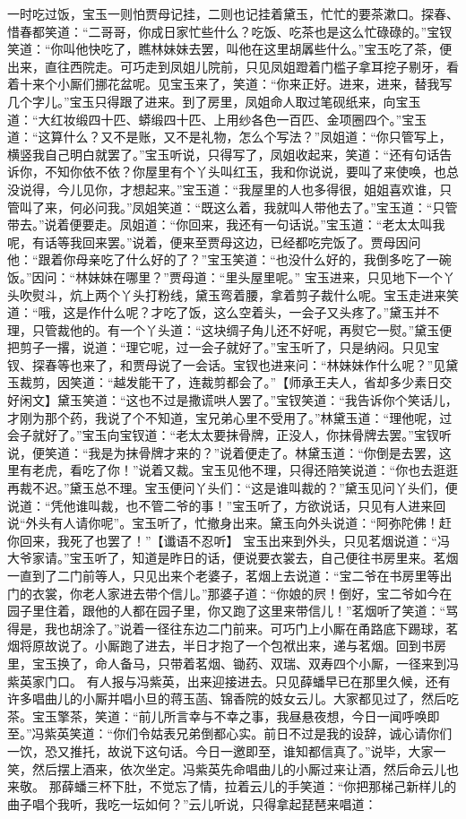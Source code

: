 \documentclass[12pt,oneside]{book}
\begin{document}
一时吃过饭，宝玉一则怕贾母记挂，二则也记挂着黛玉，忙忙的要茶漱口。探春、惜春都笑道：“二哥哥，你成日家忙些什么？吃饭、吃茶也是这么忙碌碌的。”宝钗笑道：“你叫他快吃了，瞧林妹妹去罢，叫他在这里胡羼些什么。”宝玉吃了茶，便出来，直往西院走。可巧走到凤姐儿院前，只见凤姐蹬着门槛子拿耳挖子剔牙，看着十来个小厮们挪花盆呢。见宝玉来了，笑道：“你来正好。进来，进来，替我写几个字儿。”宝玉只得跟了进来。到了房里，凤姐命人取过笔砚纸来，向宝玉道：“大红妆缎四十匹、蟒缎四十匹、上用纱各色一百匹、金项圈四个。”宝玉道：“这算什么？又不是账，又不是礼物，怎么个写法？”凤姐道：“你只管写上，横竖我自己明白就罢了。”宝玉听说，只得写了，凤姐收起来，笑道：“还有句话告诉你，不知你依不依？你屋里有个丫头叫红玉，我和你说说，要叫了来使唤，也总没说得，今儿见你，才想起来。”宝玉道：“我屋里的人也多得很，姐姐喜欢谁，只管叫了来，何必问我。”凤姐笑道：“既这么着，我就叫人带他去了。”宝玉道：“只管带去。”说着便要走。凤姐道：“你回来，我还有一句话说。”宝玉道：“老太太叫我呢，有话等我回来罢。”说着，便来至贾母这边，已经都吃完饭了。贾母因问他：“跟着你母亲吃了什么好的了？”宝玉笑道：“也没什么好的，我倒多吃了一碗饭。”因问：“林妹妹在哪里？”贾母道：“里头屋里呢。”
宝玉进来，只见地下一个丫头吹熨斗，炕上两个丫头打粉线，黛玉弯着腰，拿着剪子裁什么呢。宝玉走进来笑道：“哦，这是作什么呢？才吃了饭，这么空着头，一会子又头疼了。”黛玉并不理，只管裁他的。有一个丫头道：“这块绸子角儿还不好呢，再熨它一熨。”黛玉便把剪子一撂，说道：“理它呢，过一会子就好了。”宝玉听了，只是纳闷。只见宝钗、探春等也来了，和贾母说了一会话。宝钗也进来问：“林妹妹作什么呢？”见黛玉裁剪，因笑道：“越发能干了，连裁剪都会了。”【师承王夫人，省却多少素日交好闲文】黛玉笑道：“这也不过是撒谎哄人罢了。”宝钗笑道：“我告诉你个笑话儿，才刚为那个药，我说了个不知道，宝兄弟心里不受用了。”林黛玉道：“理他呢，过会子就好了。”宝玉向宝钗道：“老太太要抹骨牌，正没人，你抹骨牌去罢。”宝钗听说，便笑道：“我是为抹骨牌才来的？”说着便走了。林黛玉道：“你倒是去罢，这里有老虎，看吃了你！”说着又裁。宝玉见他不理，只得还陪笑说道：“你也去逛逛再裁不迟。”黛玉总不理。宝玉便问丫头们：“这是谁叫裁的？”黛玉见问丫头们，便说道：“凭他谁叫裁，也不管二爷的事！”宝玉听了，方欲说话，只见有人进来回说“外头有人请你呢”。宝玉听了，忙撤身出来。黛玉向外头说道：“阿弥陀佛！赶你回来，我死了也罢了！”【谶语不忍听】
宝玉出来到外头，只见茗烟说道：“冯大爷家请。”宝玉听了，知道是昨日的话，便说要衣裳去，自己便往书房里来。茗烟一直到了二门前等人，只见出来个老婆子，茗烟上去说道：“宝二爷在书房里等出门的衣裳，你老人家进去带个信儿。”那婆子道：“你娘的屄！倒好，宝二爷如今在园子里住着，跟他的人都在园子里，你又跑了这里来带信儿！”茗烟听了笑道：“骂得是，我也胡涂了。”说着一径往东边二门前来。可巧门上小厮在甬路底下踢球，茗烟将原故说了。小厮跑了进去，半日才抱了一个包袱出来，递与茗烟。回到书房里，宝玉换了，命人备马，只带着茗烟、锄药、双瑞、双寿四个小厮，一径来到冯紫英家门口。
有人报与冯紫英，出来迎接进去。只见薛蟠早已在那里久候，还有许多唱曲儿的小厮并唱小旦的蒋玉菡、锦香院的妓女云儿。大家都见过了，然后吃茶。宝玉擎茶，笑道：“前儿所言幸与不幸之事，我昼悬夜想，今日一闻呼唤即至。”冯紫英笑道：“你们令姑表兄弟倒都心实。前日不过是我的设辞，诚心请你们一饮，恐又推托，故说下这句话。今日一邀即至，谁知都信真了。”说毕，大家一笑，然后摆上酒来，依次坐定。冯紫英先命唱曲儿的小厮过来让酒，然后命云儿也来敬。
那薛蟠三杯下肚，不觉忘了情，拉着云儿的手笑道：“你把那梯己新样儿的曲子唱个我听，我吃一坛如何？”云儿听说，只得拿起琵琶来唱道：
\end{document}
